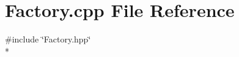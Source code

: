 \section{Factory.\-cpp File Reference}
\label{_factory_8cpp}
{\ttfamily \#include \char`\"{}Factory.\-hpp\char`\"{}}\\*

